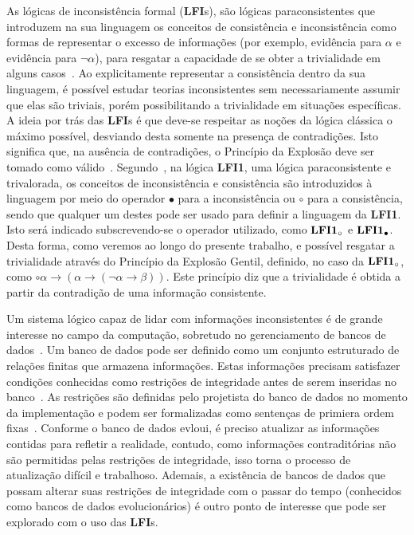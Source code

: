 As lógicas de inconsistência formal (\textbf{LFI}s), são lógicas paraconsistentes que introduzem na sua linguagem os conceitos de consistência e inconsistência como formas de representar o excesso de informações (por exemplo, evidência para $\alpha$ e evidência para $\neg \alpha$), para resgatar a capacidade de se obter a trivialidade em alguns casos~\cite{carnielli2007}. Ao explicitamente representar a consistência dentro da sua linguagem, é possível estudar teorias inconsistentes sem necessariamente assumir que elas são triviais, porém possibilitando a trivialidade em situações específicas. A ideia por trás das \textbf{LFI}s é que deve-se respeitar as noções da lógica clássica o máximo possível, desviando desta somente na presença de contradições. Isto significa que, na ausência de contradições, o Princípio da Explosão deve ser tomado como válido~\cite{sep-logic-paraconsistent}. Segundo~, na lógica \textbf{LFI1}, uma lógica paraconsistente e trivalorada, os conceitos de inconsistência e consistência são introduzidos à linguagem por meio do operador $\bullet$ para a inconsistência ou $\circ$ para a consistência, sendo que qualquer um destes pode ser usado para definir a linguagem da \textbf{LFI1}. Isto será indicado subscrevendo-se o operador utilizado, como $\text{\textbf{LFI1}}_{\circ}$ e $\text{\textbf{LFI1}}_{\bullet}$. Desta forma, como veremos ao longo do presente trabalho, e possível resgatar a trivialidade através do Princípio da Explosão Gentil, definido, no caso da $\text{\textbf{LFI1}}_{\circ}$, como $\circ \alpha \rightarrow (\alpha \rightarrow (\neg \alpha \rightarrow \beta))$\cite{carnielli2007}. Este princípio diz que a trivialidade é obtida a partir da contradição de uma informação consistente.

Um sistema lógico capaz de lidar com informações inconsistentes é de grande interesse no campo da computação, sobretudo no gerenciamento de bancos de dados~\cite{carnielli2000formal}. Um banco de dados pode ser definido como um conjunto estruturado de relações finitas que armazena informações. Estas informações precisam satisfazer condições conhecidas como restrições de integridade antes de serem inseridas no banco~\cite{Codd}. As restrições são definidas pelo projetista do banco de dados no momento da implementação e podem ser formalizadas como sentenças de primiera ordem fixas~\cite{carnielli2000formal}. Conforme o banco de dados evloui, é preciso atualizar as informações contidas para refletir a realidade, contudo, como informações contraditórias não são permitidas pelas restrições de integridade, isso torna o processo de atualização difícil e trabalhoso. Ademais, a existência de bancos de dados que possam alterar suas restrições de integridade com o passar do tempo (conhecidos como bancos de dados evolucionários) é outro ponto de interesse que pode ser explorado com o uso das \textbf{LFI}s.

